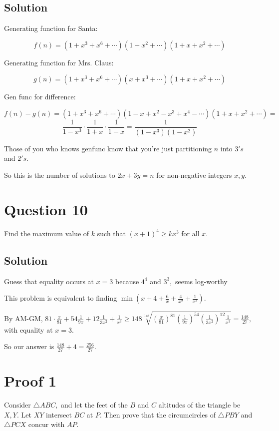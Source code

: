 \documentclass{article}
\begin{document}
\subsection{Solution}

Generating function for Santa:

\[f(n)=(1+x^3+x^6+\cdots)(1+x^2+\cdots)(1+x+x^2+\cdots)\]

Generating function for Mrs. Claus:

\[g(n)=(1+x^3+x^6+\cdots)(x+x^3+\cdots)(1+x+x^2+\cdots)\]

Gen func for difference:

\[f(n)-g(n)=(1+x^3+x^6+\cdots)(1-x+x^2-x^3+x^4-\cdots)(1+x+x^2+\cdots)=\]
\[\frac{1}{1-x^3}\cdot\frac{1}{1+x}\cdot\frac{1}{1-x}=\frac{1}{(1-x^3)(1-x^2)}\]

Those of you who knows genfunc know that you're just partitioning $n$ into $3's$ and $2's.$

So this is the number of solutions to $2x+3y=n$ for non-negative integers $x,y.$

\pagebreak\section{Question 10}

Find the maximum value of $k$ such that $(x+1)^4\geq kx^3$ for all $x.$

\subsection{Solution}

Guess that equality occurs at $x=3$ because $4^4$ and $3^3,$ seems log-worthy

This problem is equivalent to finding $\min(x+4+\frac{6}{x}+\frac{4}{x^2}+\frac{1}{x^3}).$

By AM-GM, $81\cdot\frac{x}{81}+54\frac{1}{9x}+12\frac{1}{3x^2}+\frac{1}{x^3}\geq 148\sqrt[148]{(\frac{x}{81})^{81}(\frac{1}{9x})^{54}(\frac{1}{3x^2})^{12}\frac{1}{x^3}}=\frac{148}{27},$ with equality at $x=3.$
    
    So our answer is $\frac{148}{27}+4=\frac{256}{27}.$

\pagebreak\section{Proof 1}

Consider $\triangle ABC,$ and let the feet of the $B$ and $C$ altitudes of the triangle be $X,Y.$ Let $XY$ intersect $BC$ at $P.$ Then prove that the circumcircles of $\triangle PBY$ and $\triangle PCX$ concur with $AP.$
\end{document}
